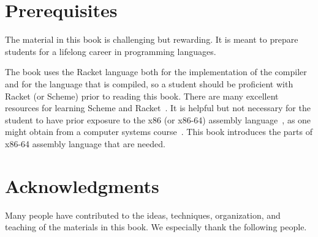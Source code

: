 \documentclass[11pt]{book}
\begin{document}
\section*{Prerequisites}

The material in this book is challenging but rewarding. It is meant to
prepare students for a lifelong career in programming languages.

The book uses the Racket language both for the implementation of the
compiler and for the language that is compiled, so a student should be
proficient with Racket (or Scheme) prior to reading this book. There
are many excellent resources for learning Scheme and
Racket~\citep{Dybvig:1987aa,Abelson:1996uq,Friedman:1996aa,Felleisen:2001aa,Felleisen:2013aa,Flatt:2014aa}. It
is helpful but not necessary for the student to have prior exposure to
the x86 (or x86-64) assembly language~\citep{Intel:2015aa}, as one might
obtain from a computer systems
course~\citep{Bryant:2005aa,Bryant:2010aa}.  This book introduces the
parts of x86-64 assembly language that are needed.



\section*{Acknowledgments}

Many people have contributed to the ideas, techniques, organization,
and teaching of the materials in this book. We especially thank the
following people.
\end{document}
